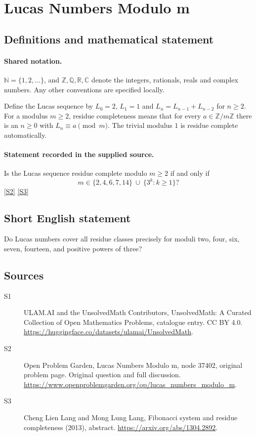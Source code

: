 \documentclass[11pt]{article}
\newcommand{\sref}[2]{\hyperlink{source:#1:#2}{[S#2]}}
\begin{document}
\section{Lucas Numbers Modulo m}\label{statement}

\subsection{Definitions and mathematical statement}

\paragraph{Shared notation.}$\mathbb N=\{1,2,\ldots\}$, and $\mathbb Z,\mathbb Q,\mathbb R,\mathbb C$ denote the integers, rationals, reals and complex numbers. Any other conventions are specified locally.


Define the Lucas sequence by $L_0=2$, $L_1=1$ and $L_n=L_{n-1}+L_{n-2}$ for $n\geq2$. For a modulus $m\geq2$, residue completeness means that for every $a\in\mathbb Z/m\mathbb Z$ there is an $n\geq0$ with $L_n\equiv a\pmod m$. The trivial modulus $1$ is residue complete automatically.
\paragraph{Statement recorded in the supplied source.}
Is the Lucas sequence residue complete modulo $m\geq2$ if and only if\[ m\in\{2,4,6,7,14\}\ \cup\ \{3^k:k\geq1\}? \] \sref{statement}{2} \sref{statement}{3}
\subsection{Short English statement}
Do Lucas numbers cover all residue classes precisely for moduli two, four, six, seven, fourteen, and positive powers of three?
\subsection{Sources}
\begin{description}
\item[\hypertarget{source:statement:1}{S1}] ULAM.AI and the UnsolvedMath Contributors, UnsolvedMath: A Curated Collection of Open Mathematics Problems, catalogue entry. CC BY 4.0. \url{https://huggingface.co/datasets/ulamai/UnsolvedMath}.
\item[\hypertarget{source:statement:2}{S2}] Open Problem Garden, Lucas Numbers Modulo m, node 37402, original problem page. Original question and full discussion. \url{https://www.openproblemgarden.org/op/lucas_numbers_modulo_m}.
\item[\hypertarget{source:statement:3}{S3}] Cheng Lien Lang and Mong Lung Lang, Fibonacci system and residue completeness (2013), abstract. \url{https://arxiv.org/abs/1304.2892}.
\end{description}
\label{end:statement}
\end{document}
